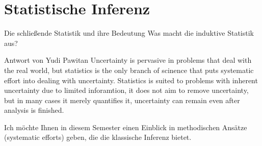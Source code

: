 \documentclass[usenames,dvipsnames,handout]{beamer}
\begin{document}
\section{Statistische Inferenz}
\begin{frame}{Die schließende Statistik und ihre Bedeutung}
Was macht die  induktive Statistik aus? 
\begin{block}{Antwort von Yudi Pawitan}
Uncertainty is pervasive in problems that deal with the real world, but statistics is the only branch of scinence that puts systematic effort into dealing with uncertainty.
Statistics is suited to problems with inherent uncertainty due to limited inforamtion, it does not aim to remove uncertainty, but in many cases it merely quantifies it, uncertainty can remain even after
analysis is finished.
\end{block}\pause
Ich möchte Ihnen in diesem Semester einen Einblick in methodischen Ansätze (systematic efforts) geben, die die klassische Inferenz bietet. 
\end{frame}

\end{document}
